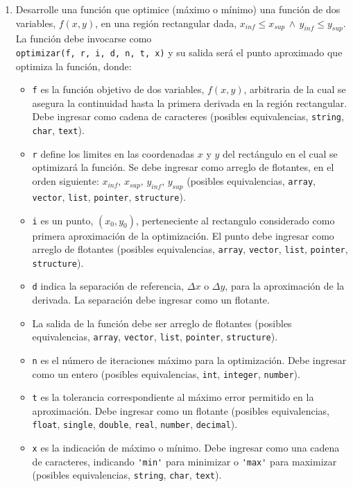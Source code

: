 \documentclass[12pt]{article}
\begin{document}
\begin{enumerate}[leftmargin=*,widest=9]
   \item Desarrolle una función que optimice (máximo o mínimo) una función de dos variables, \(f(x, y)\), en una región rectangular dada, \(x_{inf}\leq x_{sup}\, \wedge\, y_{inf}\leq y_{sup}\). La función debe invocarse como \\ \verb-optimizar(f, r, i, d, n, t, x)- y su salida será el punto aproximado que optimiza la función, donde:

         \begin{itemize}
        \item \verb-f- es la función objetivo de dos variables, \(f(x,y)\), arbitraria de la cual se asegura la continuidad hasta la primera derivada en la región rectangular. Debe ingresar como cadena de caracteres (posibles equivalencias, \verb-string-, \verb-char-, \verb-text-).
        \item \verb-r- define los limites en las coordenadas \(x\) y \(y\) del rectángulo en el cual se optimizará la función. Se debe ingresar como arreglo de flotantes, en el orden siguiente: \(x_{inf},\, x_{sup},\, y_{inf},\, y_{sup}\) (posibles equivalencias, \verb-array-, \verb-vector-, \verb-list-, \verb-pointer-, \verb-structure-).
    \item \verb-i- es un punto, \((x_0,y_0)\), perteneciente al rectangulo considerado como primera aproximación de la optimización. El punto debe ingresar como arreglo de flotantes (posibles equivalencias, \verb-array-, \verb-vector-, \verb-list-, \verb-pointer-, \verb-structure-).
    \item \verb-d- indica la separación de referencia, \(\Delta x\) o \(\Delta y\), para la aproximación de la derivada. La separación debe ingresar como un flotante.
    \item La salida de la función debe ser arreglo de flotantes (posibles equivalencias, \verb-array-, \verb-vector-, \verb-list-, \verb-pointer-, \verb-structure-).
    \item \verb-n- es el número de iteraciones máximo para la optimización. Debe ingresar como un entero (posibles equivalencias, \verb-int-, \verb-integer-, \verb-number-).
    \item \verb-t- es la tolerancia correspondiente al máximo error permitido en la aproximación. Debe ingresar como un flotante (posibles equivalencias, \verb-float-, \verb-single-, \verb-double-, \verb-real-, \verb-number-, \verb-decimal-).
    \item \verb-x- es la indicación de máximo o mínimo. Debe ingresar como una cadena de caracteres, indicando \verb-'min'- para minimizar o \verb-'max'- para maximizar (posibles equivalencias, \verb-string-, \verb-char-, \verb-text-).
    \end{itemize}


\end{enumerate}
\end{document}

